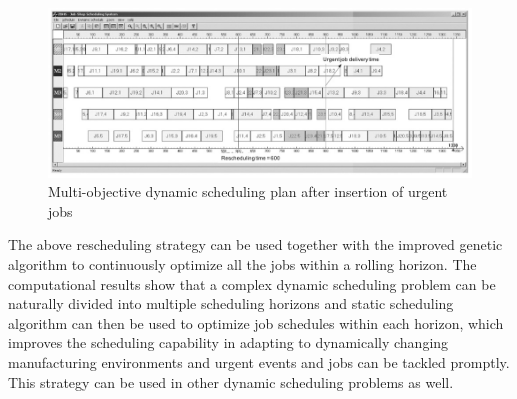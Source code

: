 \begin{figure}[h!]
	\begin{center}
		\includegraphics[width=1\linewidth]{sections/figure4.jpg}
		\caption{Multi-objective dynamic scheduling plan after insertion of urgent jobs}
		\label{fig:fig4}
	\end{center}
\end{figure}

The above rescheduling strategy can be used together with the improved genetic algorithm to continuously optimize all the jobs within a rolling horizon.
The computational results show that a complex dynamic scheduling problem can be naturally divided into multiple scheduling horizons and static scheduling algorithm can then be used to optimize job schedules within each horizon, which improves the scheduling capability in adapting to dynamically changing manufacturing environments and urgent events and jobs can be tackled promptly.
This strategy can be used in other dynamic scheduling problems as well.
